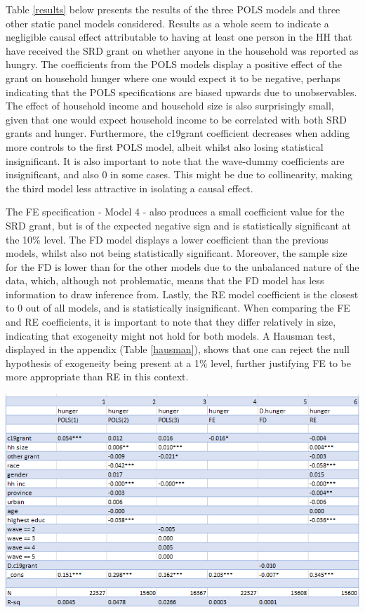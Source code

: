\documentclass[11pt,preprint, authoryear]{elsarticle}
\let\origfigure\figure
\let\endorigfigure\endfigure
\renewenvironment{figure}[1][2] {
    \expandafter\origfigure\expandafter[H]
} {
    \endorigfigure
}
\numberwithin{equation}{section}
\numberwithin{figure}{section}
\numberwithin{table}{section}
\begin{document}
Table \ref{results} below presents the results of the three POLS models
and three other static panel models considered. Results as a whole seem
to indicate a negligible causal effect attributable to having at least
one person in the HH that have received the SRD grant on whether anyone
in the household was reported as hungry. The coefficients from the POLS
models display a positive effect of the grant on household hunger where
one would expect it to be negative, perhaps indicating that the POLS
specifications are biased upwards due to unobservables. The effect of
household income and household size is also surprisingly small, given
that one would expect household income to be correlated with both SRD
grants and hunger. Furthermore, the c19grant coefficient decreases when
adding more controls to the first POLS model, albeit whilst also losing
statistical insignificant. It is also important to note that the
wave-dummy coefficients are insignificant, and also 0 in some cases.
This might be due to collinearity, making the third model less
attractive in isolating a causal effect.

The FE specification - Model 4 - also produces a small coefficient value
for the SRD grant, but is of the expected negative sign and is
statistically significant at the 10\% level. The FD model displays a
lower coefficient than the previous models, whilst also not being
statistically significant. Moreover, the sample size for the FD is lower
than for the other models due to the unbalanced nature of the data,
which, although not problematic, means that the FD model has less
information to draw inference from. Lastly, the RE model coefficient is
the closest to 0 out of all models, and is statistically insignificant.
When comparing the FE and RE coefficients, it is important to note that
they differ relatively in size, indicating that exogeneity might not
hold for both models. A Hausman test, displayed in the appendix (Table
\ref{hausman}), shows that one can reject the null hypothesis of
exogeneity being present at a 1\% level, further justifying FE to be
more appropriate than RE in this context.

\begin{figure}[H]
\includegraphics[width=1\linewidth]{figures/hunger_table} \caption{\label{results} Estimation Results (Own Calculations, Data: NIDS-CRAM)}\label{fig:results}
\end{figure}
\end{document}
